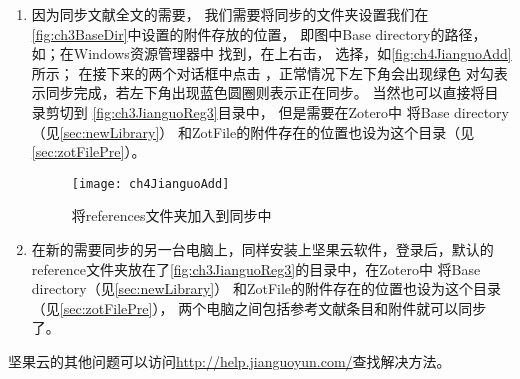 \documentclass[cn,11pt,chinese]{elegantbook}
\begin{document}
\begin{enumerate}
\begin{figure}
				\end{figure}
			\item  因为同步文献全文的需要，
				我们需要将同步的文件夹设置我们在\autoref{fig:ch3BaseDir}中设置的附件存放的位置，
				即图中Base directory的路径，
				如；在Windows资源管理器中
				找到\winpath{references}，在上右击，
				选择，如\autoref{fig:ch4JianguoAdd}所示；
				在接下来的两个对话框中点击
				，正常情况下左下角会出现绿色
				对勾表示同步完成，若左下角出现蓝色圆圈则表示正在同步。
				当然也可以直接将目录剪切到
				\autoref{fig:ch3JianguoReg3}目录中，
				但是需要在Zotero中
			将Base directory（见\cref{sec:newLibrary}）
			和ZotFile的附件存在的位置也设为这个目录（见\cref{sec:zotFilePre}）。
					\begin{figure}[htbp]
						\centering
						\texttt{[image: ch4JianguoAdd]}
						\caption{将references文件夹加入到同步中}
						\label{fig:ch4JianguoAdd}
					\end{figure}
			\item 在新的需要同步的另一台电脑上，同样安装上坚果云软件，登录后，默认的
			reference文件夹放在了\autoref{fig:ch3JianguoReg3}的目录中，在Zotero中
			将Base directory（见\cref{sec:newLibrary}）
			和ZotFile的附件存在的位置也设为这个目录（见\cref{sec:zotFilePre}）， 
			两个电脑之间包括参考文献条目和附件就可以同步了。
	
		\end{enumerate}
		

		坚果云的其他问题可以访问\url{http://help.jianguoyun.com/}查找解决方法。
		
\end{document}
